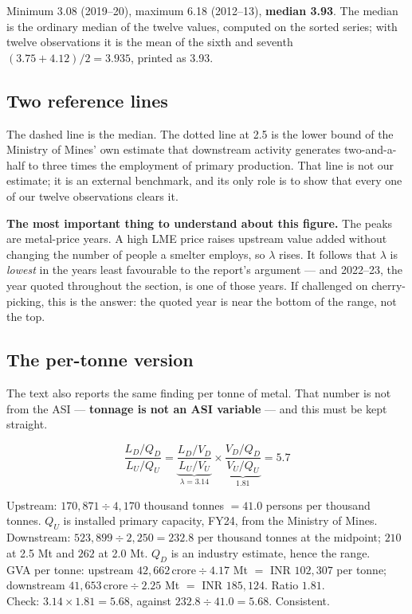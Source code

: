 \documentclass[11pt, a4paper]{article}
\newcommand{\cro}{\,\textrm{crore}}
\begin{document}
\noindent Minimum 3.08 (2019--20), maximum 6.18 (2012--13), \textbf{median 3.93}. The
median is the ordinary median of the twelve values, computed on the sorted series;
with twelve observations it is the mean of the sixth and seventh
$(3.75 + 4.12)/2 = 3.935$, printed as 3.93.

\subsection{Two reference lines}

The dashed line is the median. The dotted line at 2.5 is the lower bound of the
Ministry of Mines' own estimate that downstream activity generates two-and-a-half to
three times the employment of primary production. That line is not our estimate; it is
an external benchmark, and its only role is to show that every one of our twelve
observations clears it.

\begin{caution}
\textbf{The most important thing to understand about this figure.} The peaks are
metal-price years. A high LME price raises upstream value added without changing the
number of people a smelter employs, so $\lambda$ rises. It follows that
$\lambda$ is \emph{lowest} in the years least favourable to the report's argument ---
and 2022--23, the year quoted throughout the section, is one of those years. If
challenged on cherry-picking, this is the answer: the quoted year is near the bottom
of the range, not the top.
\end{caution}

\subsection{The per-tonne version}

The text also reports the same finding per tonne of metal. That number is not from the
ASI --- \textbf{tonnage is not an ASI variable} --- and this must be kept straight.

\[
\frac{L_D/Q_D}{L_U/Q_U}
= \underbrace{\frac{L_D/V_D}{L_U/V_U}}_{\lambda = 3.14}
\times \underbrace{\frac{V_D/Q_D}{V_U/Q_U}}_{1.81}
= 5.7
\]

\begin{work}
Upstream: $170{,}871 \div 4{,}170$ thousand tonnes $= 41.0$ persons per thousand tonnes.
$Q_U$ is installed primary capacity, FY24, from the Ministry of Mines. \\[2pt]
Downstream: $523{,}899 \div 2{,}250 = 232.8$ per thousand tonnes at the midpoint;
$210$ at 2.5 Mt and $262$ at 2.0 Mt. $Q_D$ is an industry estimate, hence the range. \\[2pt]
GVA per tonne: upstream $42{,}662\cro \div 4.17$ Mt $=$ INR $102{,}307$ per tonne;
downstream $41{,}653\cro \div 2.25$ Mt $=$ INR $185{,}124$. Ratio $1.81$. \\[2pt]
Check: $3.14 \times 1.81 = 5.68$, against $232.8 \div 41.0 = 5.68$. Consistent.
\end{work}
\end{document}
